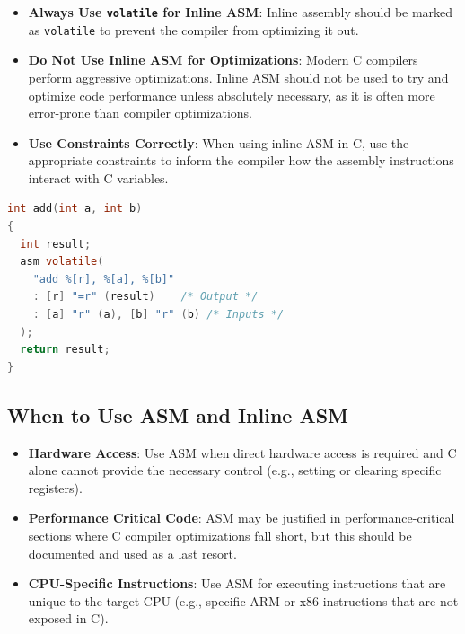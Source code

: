 \begin{itemize}
    \item \textbf{Always Use \texttt{volatile} for Inline ASM}: Inline assembly should be marked as \texttt{volatile} to prevent the compiler from optimizing it out.
    \item \textbf{Do Not Use Inline ASM for Optimizations}: Modern C compilers perform aggressive optimizations. Inline ASM should not be used to try and optimize code performance unless absolutely necessary, as it is often more error-prone than compiler optimizations.
    \item \textbf{Use Constraints Correctly}: When using inline ASM in C, use the appropriate constraints to inform the compiler how the assembly instructions interact with C variables.
\end{itemize}

\begin{lstlisting}[language=C]
int add(int a, int b)
{
  int result;
  asm volatile(
    "add %[r], %[a], %[b]"
    : [r] "=r" (result)    /* Output */
    : [a] "r" (a), [b] "r" (b) /* Inputs */
  );
  return result;
}
\end{lstlisting}

\subsection{When to Use ASM and Inline ASM}
\begin{itemize}
    \item \textbf{Hardware Access}: Use ASM when direct hardware access is required and C alone cannot provide the necessary control (e.g., setting or clearing specific registers).
    \item \textbf{Performance Critical Code}: ASM may be justified in performance-critical sections where C compiler optimizations fall short, but this should be documented and used as a last resort.
    \item \textbf{CPU-Specific Instructions}: Use ASM for executing instructions that are unique to the target CPU (e.g., specific ARM or x86 instructions that are not exposed in C).
\end{itemize}
